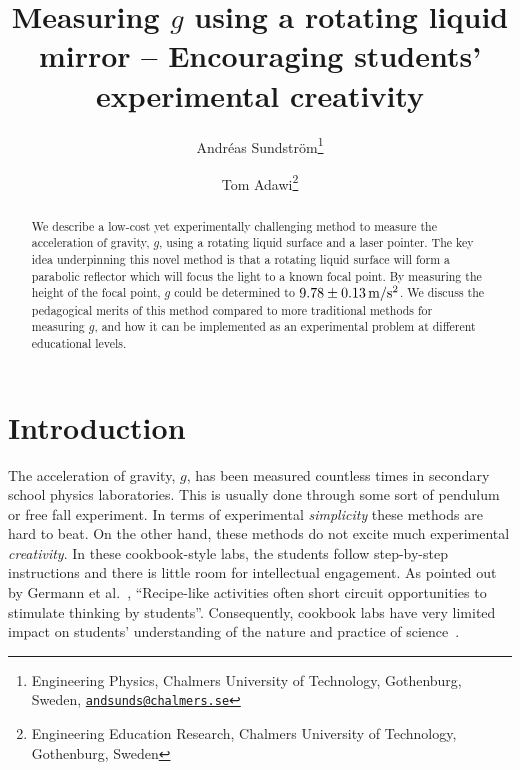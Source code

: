 \documentclass[12pt, a4paper, twocolumn]{article}
\begin{document}
\title{Measuring $g$ using a rotating liquid mirror --
  Encouraging students' experimental creativity} 

\newcommand{\andsunds}{andsunds@chalmers.se}
\author{Andréas Sundström\footnote{Engineering Physics, Chalmers
    University of Technology, Gothenburg, Sweden,
    \textcolor{blue}{\href{mailto:\andsunds}{\nolinkurl{\andsunds}}} }
\and Tom Adawi\footnote{Engineering Education Research, Chalmers
  University of Technology, Gothenburg, Sweden} 
}
\maketitle

\begin{abstract}
We describe a low-cost yet experimentally challenging method to measure the acceleration of gravity, $g$, using a rotating liquid surface and a laser pointer. The key idea underpinning this novel method is that a rotating liquid surface will form a parabolic reflector which will focus the light to a known focal point. By measuring the height of the focal point, $g$ could be determined to $\unit[9.78 \pm 0.13]{m/s^2}$. We discuss the pedagogical merits of this method compared to more traditional methods for measuring $g$, and how it can be implemented as an experimental problem at different educational levels. 
\end{abstract}


\section{Introduction}

The acceleration of gravity, $g$, has been measured countless times in secondary school physics laboratories. This is usually done through some sort of pendulum or free fall experiment. In terms of experimental \emph{simplicity} these methods are hard to beat. On the other hand, these methods do not excite much experimental \emph{creativity}. In these cookbook-style labs, the students follow step-by-step instructions and there is little room for intellectual engagement. As pointed out by Germann et al.~\cite{Germann1996}, 
``Recipe-like activities often short circuit opportunities to stimulate thinking by students''. 
Consequently, cookbook labs have very limited impact on students' understanding of the nature and practice of science~\cite{Domin1999}. 
\end{document}
